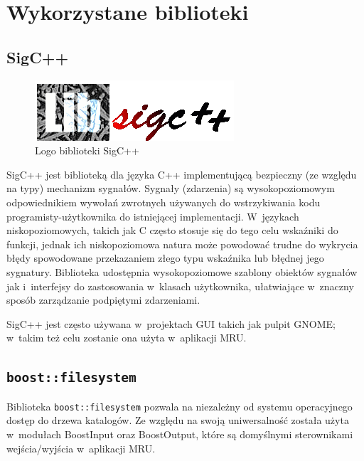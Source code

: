 
\section{Wykorzystane biblioteki}
\label{wykorzystane-biblioteki}

\subsection{SigC++}
\begin{figure}
\begin{center}
\includegraphics[scale=0.50]{img/sigcpp_logo.png}
\end{center}
\caption{Logo biblioteki SigC++}
\end{figure}
\par
SigC++ jest biblioteką dla języka C++ implementującą bezpieczny (ze względu na typy) mechanizm sygnałów.
Sygnały (zdarzenia) są wysokopoziomowym odpowiednikiem wywołań zwrotnych używanych do wstrzykiwania kodu programisty-użytkownika do istniejącej implementacji. W~językach niskopoziomowych, takich jak C często stosuje się do tego celu wskaźniki do funkcji, jednak ich niskopoziomowa natura może powodować trudne do wykrycia błędy spowodowane przekazaniem złego typu wskaźnika lub błędnej jego sygnatury. Biblioteka udostępnia wysokopoziomowe szablony obiektów sygnałów jak i~interfejsy do zastosowania w~klasach użytkownika, ułatwiające w~znaczny sposób zarządzanie podpiętymi zdarzeniami.\\
\par
SigC++ jest często używana w~projektach GUI takich jak pulpit GNOME; w~takim też celu zostanie ona użyta w~aplikacji MRU.

\subsection{\texttt{boost::filesystem}}
\par
Biblioteka \texttt{boost::filesystem} pozwala na niezależny od systemu operacyjnego dostęp do drzewa katalogów\cite{wiecej-niz-cpp-boost}. Ze względu na swoją uniwersalność została użyta w~modułach BoostInput oraz BoostOutput, które są domyślnymi sterownikami wejścia/wyjścia w~aplikacji MRU.

